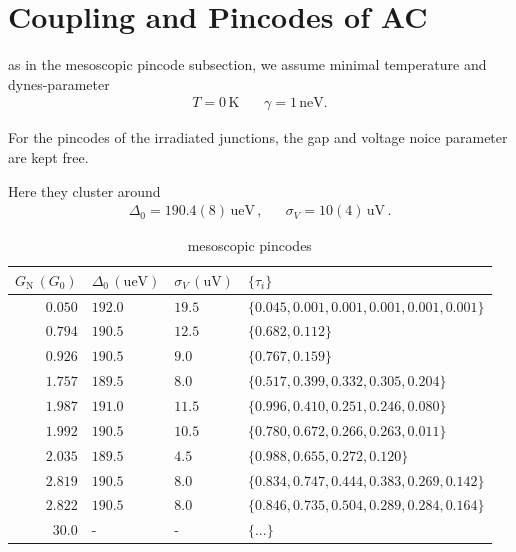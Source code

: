 \chapter{Coupling and Pincodes of AC}
\label{appendix:coupling-and-pincode}

        as in the mesoscopic pincode subsection, we assume minimal temperature and dynes-parameter
        \begin{align}
            T = 0\,\mathrm{K}\, &&
            \gamma = 1\,\mathrm{neV}.
            \label{eq:ac:photon-assisted-transport:assumptions}
        \end{align}

        For the pincodes of the irradiated junctions, the gap and voltage noice parameter are kept free.

        Here they cluster around
        \begin{align}
            \Delta_0 = 190.4(8)\,\mathrm{ueV}\,, &&
            \sigma_V = 10(4)\,\mathrm{uV}\,.
            \label{eq:ac:photon-assisted-transport:parameter}
        \end{align}

        \begin{table}[t]
            \centering
            \caption{mesoscopic pincodes}
            \label{table:ac:pincodes}
            \begin{tabular}{r|l|l|l}
                $G_\mathrm{N}\,(G_0)$ & $\Delta_0\,(\mathrm{ueV})$ & $\sigma_V\,(\mathrm{uV})$ & $\{\tau_i\}$ \\\hline
                $0.050$ & $192.0$ & $19.5$ & $\{0.045, 0.001, 0.001, 0.001, 0.001, 0.001\}$ \\ %
                $0.794$ & $190.5$ & $12.5$ & $\{0.682, 0.112\}$\\ %
                $0.926$ & $190.5$ &  $9.0$ & $\{0.767, 0.159\}$\\ %
                $1.757$ & $189.5$ &  $8.0$ & $\{0.517, 0.399, 0.332, 0.305, 0.204\}$\\ %
                $1.987$ & $191.0$ & $11.5$ & $\{0.996, 0.410, 0.251, 0.246, 0.080\}$ \\ %
                $1.992$ & $190.5$ & $10.5$ & $\{0.780, 0.672, 0.266, 0.263, 0.011\}$ \\ %
                $2.035$ & $189.5$ &  $4.5$ & $\{0.988, 0.655, 0.272, 0.120\}$\\ %
                $2.819$ & $190.5$ & $8.0$ & $\{0.834, 0.747, 0.444, 0.383, 0.269, 0.142\}$ \\ %
                $2.822$ & $190.5$ & $8.0$ & $\{0.846, 0.735, 0.504, 0.289, 0.284, 0.164\}$ \\ %
                $30.0$  & -       & -     & $\{...\}$ %
            \end{tabular}
        \end{table}

